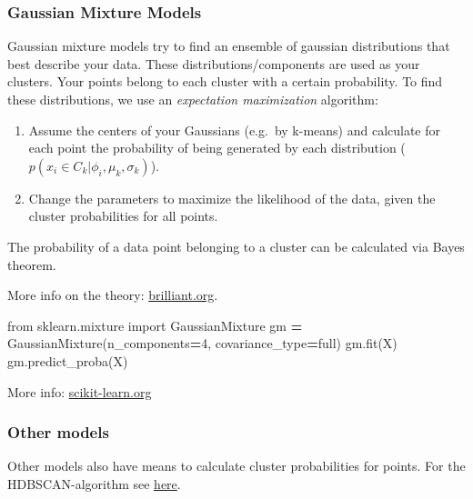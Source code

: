 \documentclass[
]{book}
\newenvironment{Shaded}{\begin{snugshade}}{\end{snugshade}}
\newcommand{\DecValTok}[1]{\textcolor[rgb]{0.00,0.00,0.81}{#1}}
\newcommand{\ImportTok}[1]{#1}
\newcommand{\NormalTok}[1]{#1}
\newcommand{\OperatorTok}[1]{\textcolor[rgb]{0.81,0.36,0.00}{\textbf{#1}}}
\newcommand{\StringTok}[1]{\textcolor[rgb]{0.31,0.60,0.02}{#1}}
\begin{document}
\hypertarget{gaussian-mixture-models}{%
\subsubsection{Gaussian Mixture Models}\label{gaussian-mixture-models}}

Gaussian mixture models try to find an ensemble of gaussian
distributions that best describe your data. These
distributions/components are used as your clusters. Your points belong
to each cluster with a certain probability. To find these distributions,
we use an \emph{expectation maximization} algorithm:

\begin{enumerate}
\def\labelenumi{\arabic{enumi}.}
\item
  Assume the centers of your Gaussians (e.g.~by k-means) and calculate
  for each point the probability of being generated by each
  distribution (\(p(x_i \in C_k | \phi_i, \mu_k, \sigma_k)\)).
\item
  Change the parameters to maximize the likelihood of the data, given
  the cluster probabilities for all points.
\end{enumerate}

The probability of a data point belonging to a cluster can be calculated
via Bayes theorem.

More info on the theory:
\href{https://brilliant.org/wiki/gaussian-mixture-model/}{brilliant.org}.

\begin{Shaded}
\begin{Highlighting}[]
\ImportTok{from}\NormalTok{ sklearn.mixture }\ImportTok{import}\NormalTok{ GaussianMixture}
\NormalTok{gm }\OperatorTok{=}\NormalTok{ GaussianMixture(n\_components}\OperatorTok{=}\DecValTok{4}\NormalTok{, covariance\_type}\OperatorTok{=}\StringTok{\textquotesingle{}full\textquotesingle{}}\NormalTok{)}
\NormalTok{gm.fit(X)}
\NormalTok{gm.predict\_proba(X)}
\end{Highlighting}
\end{Shaded}

More info:
\href{https://scikit-learn.org/stable/modules/generated/sklearn.mixture.GaussianMixture.html}{scikit-learn.org}

\hypertarget{other-models}{%
\subsubsection{Other models}\label{other-models}}

Other models also have means to calculate cluster probabilities for
points. For the HDBSCAN-algorithm see
\href{https://hdbscan.readthedocs.io/en/latest/soft_clustering.html}{here}.
\end{document}

